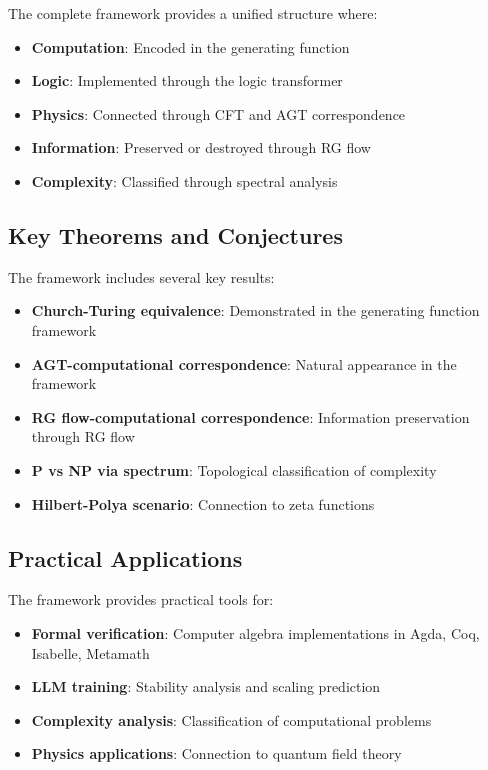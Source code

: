 The complete framework provides a unified structure where:
\begin{itemize}
\item \textbf{Computation}: Encoded in the generating function
\item \textbf{Logic}: Implemented through the logic transformer
\item \textbf{Physics}: Connected through CFT and AGT correspondence
\item \textbf{Information}: Preserved or destroyed through RG flow
\item \textbf{Complexity}: Classified through spectral analysis
\end{itemize}

\subsection{Key Theorems and Conjectures}

The framework includes several key results:
\begin{itemize}
\item \textbf{Church-Turing equivalence}: Demonstrated in the generating function framework
\item \textbf{AGT-computational correspondence}: Natural appearance in the framework
\item \textbf{RG flow-computational correspondence}: Information preservation through RG flow
\item \textbf{P vs NP via spectrum}: Topological classification of complexity
\item \textbf{Hilbert-Polya scenario}: Connection to zeta functions
\end{itemize}

\subsection{Practical Applications}

The framework provides practical tools for:
\begin{itemize}
\item \textbf{Formal verification}: Computer algebra implementations in Agda, Coq, Isabelle, Metamath
\item \textbf{LLM training}: Stability analysis and scaling prediction
\item \textbf{Complexity analysis}: Classification of computational problems
\item \textbf{Physics applications}: Connection to quantum field theory
\end{itemize}

